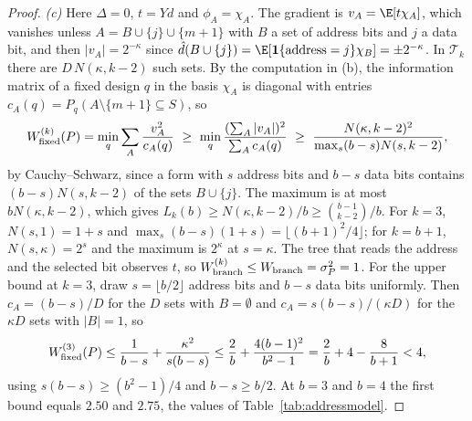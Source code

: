 \begin{proof}
\emph{(c)} Here $\Delta=0$, $t=Yd$ and $\phi_A=\chi_A$. The gradient is
$v_A=\E[t\chi_A]$, which vanishes unless $A=B\cup\{j\}\cup\{m+1\}$ with $B$ a
set of address bits and $j$ a data bit, and then $|v_A|=2^{-\kappa}$ since
$\hat d(B\cup\{j\})=\E[\mathbf 1\{\text{address}=j\}\chi_B]=\pm2^{-\kappa}$. In
$\mathcal T_k$ there are $D\,N(\kappa,k-2)$ such sets. By the computation in
(b), the information matrix of a fixed design $q$ in the basis $\chi_A$ is
diagonal with entries $c_A(q)=P_q(A\setminus\{m+1\}\subseteq S)$, so
\[
 W^{(k)}_{\rm fixed}(P)=\min_q\sum_A\frac{v_A^2}{c_A(q)}\ \ge\ \min_q\frac{(\sum_A|v_A|)^2}{\sum_Ac_A(q)}
   \ \ge\ \frac{N(\kappa,k-2)^2}{\max_{s}(b-s)N(s,k-2)},
\]
by Cauchy--Schwarz, since a form with $s$ address bits and $b-s$ data bits
contains $(b-s)N(s,k-2)$ of the sets $B\cup\{j\}$. The maximum is at most
$bN(\kappa,k-2)$, which gives $L_k(b)\ge N(\kappa,k-2)/b\ge\binom{b-1}{k-2}/b$.
For $k=3$, $N(s,1)=1+s$ and $\max_s(b-s)(1+s)=\lfloor(b+1)^2/4\rfloor$; for
$k=b+1$, $N(s,\kappa)=2^s$ and the maximum is $2^\kappa$ at $s=\kappa$. The
tree that reads the address and the selected bit observes $t$, so
$W^{(k)}_{\rm branch}\le W_{\rm branch}=\sigma_P^2=1$. For the upper bound at
$k=3$, draw $s=\lfloor b/2\rfloor$ address bits and $b-s$ data bits uniformly.
Then $c_A=(b-s)/D$ for the $D$ sets with $B=\emptyset$ and
$c_A=s(b-s)/(\kappa D)$ for the $\kappa D$ sets with $|B|=1$, so
\[
 W^{(3)}_{\rm fixed}(P)\le\frac1{b-s}+\frac{\kappa^2}{s(b-s)}
   \le\frac2b+\frac{4(b-1)^2}{b^2-1}=\frac2b+4-\frac8{b+1}<4,
\]
using $s(b-s)\ge(b^2-1)/4$ and $b-s\ge b/2$. At $b=3$ and $b=4$ the first
bound equals $2.50$ and $2.75$, the values of Table~\ref{tab:addressmodel}.


\end{proof}
